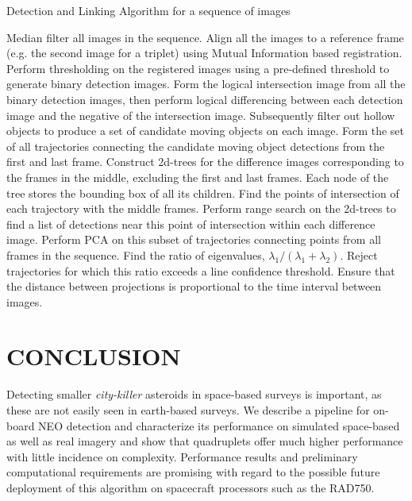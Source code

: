 \documentclass{article}
\begin{document}
\vspace{-0.1cm}
\begin{algorithm}[H]
\small
\caption{Detection and Linking Algorithm for a sequence of images}
\label{algo:Trajectory_Linking}
\begin{algorithmic}[1]
\State Median filter all images in the sequence.
\State Align all the images to a reference frame (e.g. the second image for a triplet) using Mutual Information based registration.
\State Perform thresholding on the registered images using a pre-defined threshold to generate  binary detection images. 
\State Form the logical intersection image from all the binary detection images, then perform logical differencing between each detection image and the negative of the intersection image.
\State Subsequently filter out hollow objects to produce a set of candidate moving objects on each image.  
\State Form the set of all trajectories connecting the candidate moving object detections from the first and last frame.
\State Construct 2d-trees for the difference images corresponding to the frames in the middle, excluding the first and last frames. Each node of the tree stores the bounding box of all its children. 
\State Find the points of intersection of each trajectory with the middle frames.
\State Perform range search on the 2d-trees to find a list of detections near this point of intersection within each difference image. 
\State Perform PCA on this subset of trajectories connecting points from all frames in the sequence. Find the ratio of eigenvalues, $\lambda_{1}/(\lambda_{1}+ \lambda_{2})$. Reject trajectories for which this ratio exceeds a line confidence threshold. Ensure that the distance between projections is proportional to the time interval between images. 
\EndFor
\end{algorithmic}
\label{code}
\end{algorithm}
\vspace{-0.3cm}
\vspace{-0.3cm}


\vspace{-0.3cm}
\section{CONCLUSION}
Detecting smaller {\em city-killer} asteroids in space-based surveys is important, as these  are not easily seen in earth-based surveys. We describe a pipeline for on-board NEO detection and characterize its performance on simulated space-based as well as real imagery and show that quadruplets offer much higher performance with little incidence on complexity. Performance results and preliminary computational requirements are promising with regard to the possible future deployment of this algorithm on spacecraft processors such as the RAD750. 
\end{document}
